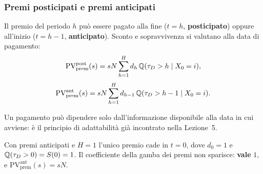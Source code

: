 \begin{frame}%
%

\frametitle{Premi posticipati e premi anticipati}%
%

%


Il premio del periodo $h$ pu\`{o} essere pagato alla fine ($t=h$,
\textbf{posticipato}) oppure all'inizio ($t=h-1$, \textbf{anticipato}). Sconto
e sopravvivenza si valutano alla data di pagamento:
\[
\mathrm{PV}_{\mathrm{prem}}^{\mathrm{post}}(s) = sN\sum_{h=1}^{H}%
d_{h}\,\Q(\tau_{D}>h\mid X_{0}=i),
\]
\[
\mathrm{PV}_{\mathrm{prem}}^{\mathrm{ant}}(s) = sN\sum_{h=1}^{H}%
d_{h-1}\,\Q(\tau_{D}>h-1\mid X_{0}=i).
\]


\medskip

\begin{stepitemize}
\item Un pagamento pu\`{o} dipendere solo dall'informazione disponibile alla
data in cui avviene: \`{e} il principio di adattabilit\`{a} gi\`{a} incontrato
nella Lezione~5.

\item Con premi anticipati e $H=1$ l'unico premio cade in $t=0$, dove
$d_{0}=1$ e $\mathbb{Q}(\tau_{D}>0)=S(0)=1$. Il coefficiente della gamba dei premi non
sparisce: \textbf{vale} $1$, e $\mathrm{PV}_{\mathrm{prem}}^{\mathrm{ant}%
}(s)=sN$.
\end{stepitemize}

%

\transboxout
\end{frame}%


%

